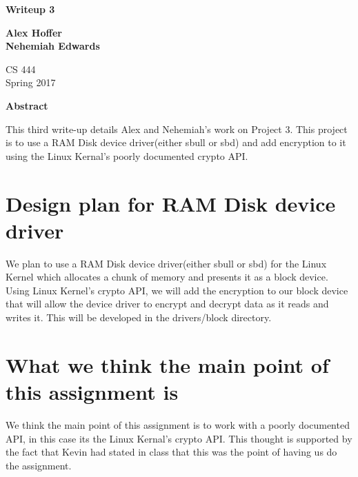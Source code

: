 \documentclass[letterpaper,10pt,titlepage]{article}
\begin{document}
\begin{titlepage}
    \begin{center}
        \vspace*{3.5cm}

        \textbf{Writeup 3}

        \vspace{0.5cm}

        \textbf{Alex Hoffer\\}
	\textbf{Nehemiah Edwards}

        \vspace{0.8cm}

        CS 444\\
        Spring 2017\\

        \vspace{1cm}

        \textbf{Abstract}\\

        \vspace{0.5cm}

	This third write-up details Alex and Nehemiah's work on Project 3. This project is to use a RAM Disk device driver(either sbull or sbd) and add encryption to it using the Linux Kernal's poorly documented crypto API.

        \vfill

    \end{center}
\end{titlepage}

\newpage

\tableofcontents

\newpage

\section{Design plan for RAM Disk device driver}
We plan to use a RAM Disk device driver(either sbull or sbd) for the Linux Kernel which allocates a chunk of memory and presents it as a block device. Using Linux Kernel's crypto API, we will add the encryption to our block device that will allow the device driver to encrypt and decrypt data as it reads and writes it. This will be developed in the drivers/block directory.

\section{What we think the main point of this assignment is}
We think the main point of this assignment is to work with a poorly documented API, in this case its the Linux Kernal's crypto API. This thought is supported by the fact that Kevin had stated in class that this was the point of having us do the assignment.
\end{document}
